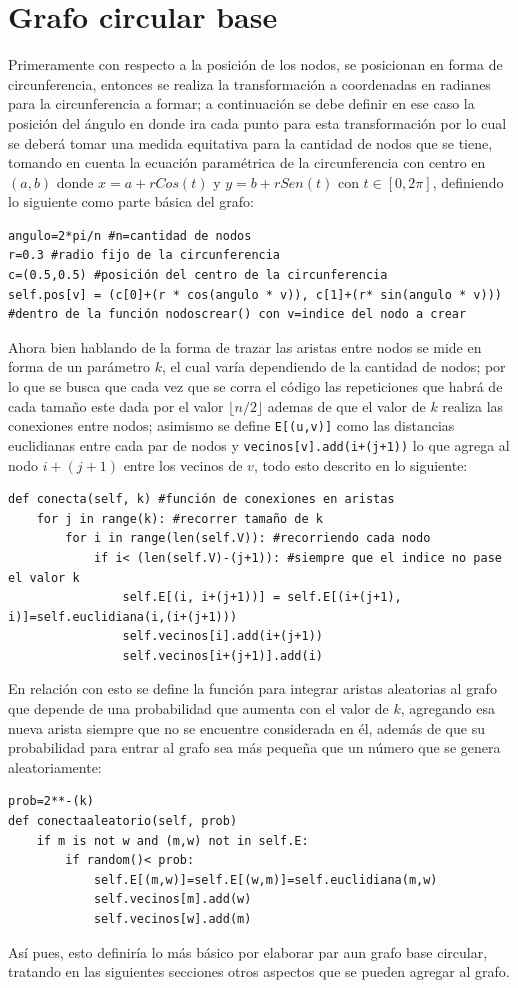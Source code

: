 \documentclass[12pt]{article}
\begin{document}
\section{Grafo circular base}
Primeramente con respecto a la posición de los nodos, se posicionan en forma de circunferencia, entonces se realiza la transformación a coordenadas en radianes para la circunferencia a formar; a continuación se debe definir en ese caso la posición del ángulo en donde ira cada punto para esta transformación por lo cual se deberá tomar una medida equitativa para la cantidad de nodos que se tiene, tomando en cuenta la ecuación paramétrica de la circunferencia con centro en $(a,b)$ donde $x=a+rCos(t)$ y $y=b+rSen(t)$ con $t\in[0,2\pi]$, definiendo lo siguiente como parte básica del grafo:
\begin{lstlisting}[style=tt]
angulo=2*pi/n #n=cantidad de nodos
r=0.3 #radio fijo de la circunferencia
c=(0.5,0.5) #posición del centro de la circunferencia
self.pos[v] = (c[0]+(r * cos(angulo * v)), c[1]+(r* sin(angulo * v))) #dentro de la función nodoscrear() con v=indice del nodo a crear
\end{lstlisting}
Ahora bien hablando de la forma de trazar las aristas entre nodos se mide en forma de un parámetro $k$, el cual varía dependiendo de la cantidad de nodos; por lo que se busca que cada vez que se corra el código las repeticiones que habrá de cada tamaño este dada por el valor $ \lfloor n/2 \rfloor $ ademas de que el valor de $k$ realiza las conexiones entre nodos; asimismo se define \texttt{E[(u,v)]} como las distancias euclidianas entre cada par de nodos y \texttt{vecinos[v].add(i+(j+1))} lo que agrega al nodo $i+(j+1)$  entre los vecinos de $v$, todo esto descrito en lo siguiente:
\begin{lstlisting}[style=tt]
def conecta(self, k) #función de conexiones en aristas
	for j in range(k): #recorrer tamaño de k
		for i in range(len(self.V)): #recorriendo cada nodo
			if i< (len(self.V)-(j+1)): #siempre que el indice no pase el valor k
				self.E[(i, i+(j+1))] = self.E[(i+(j+1), i)]=self.euclidiana(i,(i+(j+1)))
				self.vecinos[i].add(i+(j+1))
				self.vecinos[i+(j+1)].add(i)
\end{lstlisting}
En relación con esto se define la función para integrar aristas aleatorias al grafo que depende de una probabilidad que aumenta con el valor de $k$, agregando esa nueva arista siempre que no se encuentre considerada en él, además de que su probabilidad para entrar al grafo sea más pequeña que un número que se genera aleatoriamente:
\begin{lstlisting}[style=tt]
prob=2**-(k)
def conectaaleatorio(self, prob)
	if m is not w and (m,w) not in self.E:
		if random()< prob:
			self.E[(m,w)]=self.E[(w,m)]=self.euclidiana(m,w)
			self.vecinos[m].add(w)
			self.vecinos[w].add(m)
\end{lstlisting}
Así pues, esto definiría lo más básico por elaborar par aun grafo base circular, tratando en las siguientes secciones otros aspectos que se pueden agregar al grafo.
\end{document}
